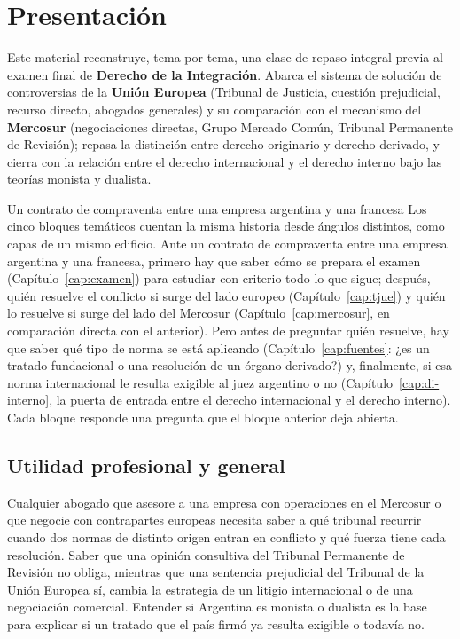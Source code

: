 \documentclass[12pt,oneside]{book}
\begin{document}
\chapter*{Presentación}

Este material reconstruye, tema por tema, una clase de repaso integral previa al examen final de \textbf{Derecho de la Integración}. Abarca el sistema de solución de controversias de la \textbf{Unión Europea} (Tribunal de Justicia, cuestión prejudicial, recurso directo, abogados generales) y su comparación con el mecanismo del \textbf{Mercosur} (negociaciones directas, Grupo Mercado Común, Tribunal Permanente de Revisión); repasa la distinción entre derecho originario y derecho derivado, y cierra con la relación entre el derecho internacional y el derecho interno bajo las teorías monista y dualista.

\begin{example}{Un contrato de compraventa entre una empresa argentina y una francesa}
Los cinco bloques temáticos cuentan la misma historia desde ángulos distintos, como capas de un mismo edificio. Ante un contrato de compraventa entre una empresa argentina y una francesa, primero hay que saber cómo se prepara el examen (Capítulo~\ref{cap:examen}) para estudiar con criterio todo lo que sigue; después, quién resuelve el conflicto si surge del lado europeo (Capítulo~\ref{cap:tjue}) y quién lo resuelve si surge del lado del Mercosur (Capítulo~\ref{cap:mercosur}, en comparación directa con el anterior). Pero antes de preguntar quién resuelve, hay que saber qué tipo de norma se está aplicando (Capítulo~\ref{cap:fuentes}: ¿es un tratado fundacional o una resolución de un órgano derivado?) y, finalmente, si esa norma internacional le resulta exigible al juez argentino o no (Capítulo~\ref{cap:di-interno}, la puerta de entrada entre el derecho internacional y el derecho interno). Cada bloque responde una pregunta que el bloque anterior deja abierta.
\end{example}

\section*{Utilidad profesional y general}

Cualquier abogado que asesore a una empresa con operaciones en el Mercosur o que negocie con contrapartes europeas necesita saber a qué tribunal recurrir cuando dos normas de distinto origen entran en conflicto y qué fuerza tiene cada resolución. Saber que una opinión consultiva del Tribunal Permanente de Revisión no obliga, mientras que una sentencia prejudicial del Tribunal de la Unión Europea sí, cambia la estrategia de un litigio internacional o de una negociación comercial. Entender si Argentina es monista o dualista es la base para explicar si un tratado que el país firmó ya resulta exigible o todavía no.
\end{document}
